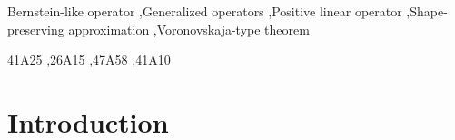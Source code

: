 \documentclass[preprint,12pt]{elsarticle}
\theoremstyle{definition}
\theoremstyle{theorem}
\theoremstyle{lemma}
\theoremstyle{example}
\theoremstyle{remark}
\theoremstyle{prop}
\begin{document}
\begin{frontmatter}
\begin{abstract}
The $\alpha$-Bernstein operators were initially introduced in the paper by Chen, X., Tan, J., Liu, Z., Xie, J. (2017) titled "Approximation of Functions by a New Family of Generalized Bernstein Operators" (Journal of Mathematical Analysis and Applications, 450(1), 244-261). Since their introduction, these operators have served as a source of inspiration for numerous research endeavors. In this study,  we propose a novel  technique, founded on a recursive relation,  for constructing Bernstein-like bases. A special case of this new representation yields a novel portrayal of Chen's operators. This innovative representation enables the discovery of additional properties of $\alpha$-Bernstein operators and facilitates alternative and more straightforward proofs for certain theorems.
\end{abstract}



\begin{keyword}
Bernstein-like operator \sep  Generalized operators \sep Positive linear operator \sep Shape-preserving approximation \sep Voronovskaja-type theorem

\MSC[2020]  41A25 \sep 26A15 \sep  47A58 \sep 41A10

\end{keyword}

\end{frontmatter}


\section{Introduction}  \label{}
\end{document}
